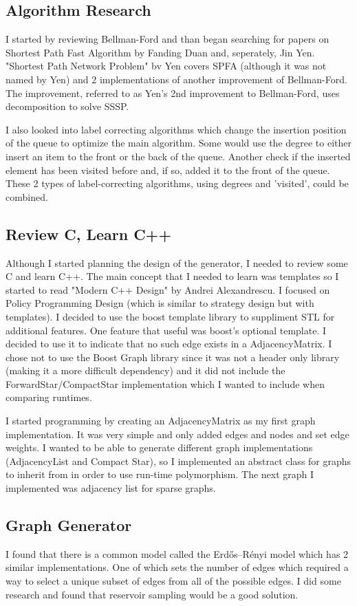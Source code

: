 \documentclass{article}
\begin{document}
\subsection{Algorithm Research}
I started by reviewing Bellman-Ford and than began searching for papers on Shortest Path Fast Algorithm by Fanding Duan and, seperately, Jin Yen. "Shortest Path Network Problem" bv Yen covers SPFA (although it was not named by Yen) and 2 implementations of another improvement of Bellman-Ford. The improvement, referred to as Yen's 2nd improvement to Bellman-Ford, uses decomposition to solve SSSP. 

I also looked into label correcting algorithms which change the insertion position of the queue to optimize the main algorithm. Some would use the degree to either insert an item to the front or the back of the queue. Another check if the inserted element has been visited before and, if so, added it to the front of the queue. These 2 types of label-correcting algorithms, using degrees and 'visited', could be combined.

\subsection{Review C, Learn C++}
Although I started planning the design of the generator, I needed to review some C and learn C++. The main concept that I needed to learn was templates so I started to read "Modern C++ Design" by Andrei Alexandrescu. I focused on Policy Programming Design (which is similar to strategy design but with templates). I decided to use the boost template library to suppliment STL for additional features. One feature that useful was boost's optional template. I decided to use it to indicate that no such edge exists in a AdjacencyMatrix. I chose not to use the Boost Graph library since it was not a header only library (making it a more difficult dependency) and it did not include the ForwardStar/CompactStar implementation which I wanted to include when comparing runtimes.

I started programming by creating an AdjacencyMatrix as my first graph implementation. It was very simple and only added edges and nodes and set edge weights. I wanted to be able to generate different graph implementations (AdjacencyList and Compact Star), so I implemented an abstract class for graphs to inherit from in order to use run-time polymorphism. The next graph I implemented was adjacency list for sparse graphs. 

\subsection{Graph Generator}
I found that there is a common model called the Erdős–Rényi model which has 2 similar implementations. One of which sets the number of edges which required a way to select a unique subset of edges from all of the possible edges. I did some research and found that reservoir sampling would be a good solution. 
\end{document}
